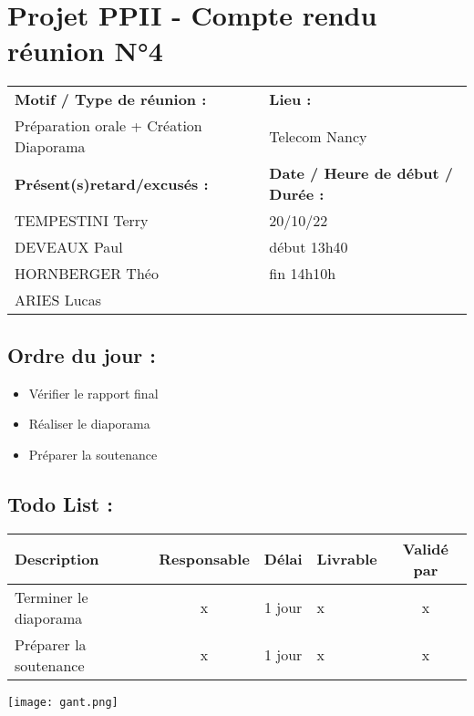 \documentclass{report}
\begin{document}
\section*{Projet PPII - Compte rendu réunion N°4}
\begin{tabular}{|p{7cm}|p{6cm}|}
    \hline
    \textbf{Motif / Type de réunion :}
    & \textbf{Lieu :}
    \\
    Préparation orale + Création Diaporama
    & 
    Telecom Nancy
    \\ \hline
    \textbf{Présent(s)retard/excusés :}
    &
    \textbf{Date / Heure de début / Durée :}
    \\ 
    TEMPESTINI Terry &  20/10/22\\  
    DEVEAUX Paul & début 13h40\\
    HORNBERGER Théo & fin 14h10h\\
    ARIES Lucas & 
    \\ \hline
\end{tabular}

\subsection*{Ordre du jour :}
\begin{itemize}
    \item{Vérifier le rapport final}
    \item{Réaliser le diaporama}
    \item{Préparer la soutenance}
\end{itemize}

\subsection*{Todo List :}
\begin{tabular}{|p{3.5cm}|c|c|p{4.5cm}|c|}
    \hline 
    Description & Responsable & Délai & Livrable & Validé par 
    \\ \hline
    Terminer le diaporama & x & 1 jour & x & x
    \\ \hline
    Préparer la soutenance & x & 1 jour & x & x
    \\ \hline
\end{tabular}

\newpage
\texttt{[image: gant.png]}
\end{document}
